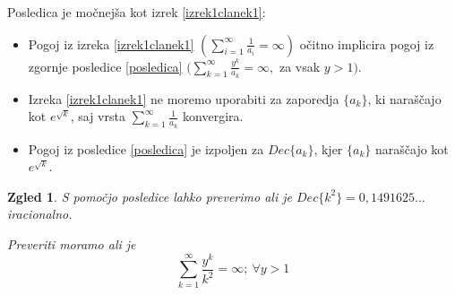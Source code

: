 \documentclass{beamer}
\newtheorem{zgled}{Zgled}
\begin{document}
\begin{frame}
    Posledica je močnejša kot izrek \ref{izrek1clanek1}:
    \begin{itemize}
        \item Pogoj iz izreka \ref{izrek1clanek1} 
        $(\sum_{i=1}^{\infty} \frac{1}{a_i} = \infty)$ očitno implicira
        pogoj iz zgornje posledice \ref{posledica}
        $(\sum_{k=1}^{\infty}\frac{y^k}{a_k} = \infty ,$ za vsak $y > 1)$.
        \pause
        \item Izreka \ref{izrek1clanek1} ne moremo uporabiti za zaporedja $\{a_k\}$, ki naraščajo kot $e^{\sqrt{k}}$,
                saj vrsta $\sum_{k=1}^{\infty}\frac{1}{a_k}$ konvergira.
            \pause
        \item Pogoj iz posledice \ref{posledica} je izpoljen za $Dec\{a_k\}$, kjer $\{a_k\}$ naraščajo kot $e^{\sqrt{k}}$.
        \newline
        \newline
        \newline
        \newline
    \end{itemize}
\end{frame}

\begin{frame}
    \begin{zgled}
        S pomočjo posledice lahko preverimo ali je $Dec\{k^2\} = 0,1491625\dots$ iracionalno.
        \pause
        
        Preveriti moramo ali je \[\sum_{k=1}^{\infty}\frac{y^k}{k^2} = \infty; \ \forall y > 1\]
        \newline
        \newline
        \newline
        \newline
        \newline
        \newline
    \end{zgled}
    

\end{frame}
\end{document}
